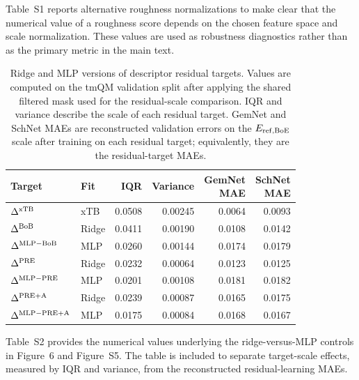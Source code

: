 \documentclass[11pt]{article}
\begin{document}
Table~S1 reports alternative roughness normalizations to make clear that the numerical value of a roughness score depends on the chosen feature space and scale normalization. These values are used as robustness diagnostics rather than as the primary metric in the main text.

\begin{table}[H]
  \centering
  \small
  \setlength{\tabcolsep}{7pt}
  \caption{Ridge and MLP versions of descriptor residual targets. Values are computed on the tmQM validation split after applying the shared filtered mask used for the residual-scale comparison. IQR and variance describe the scale of each residual target. GemNet and SchNet MAEs are reconstructed validation errors on the \(E_{\rm ref,BoE}\) scale after training on each residual target; equivalently, they are the residual-target MAEs.}
  \label{tab:linear-vs-mlp-residuals}
  \begin{tabular}{llrrrr}
    \toprule
    Target &
    Fit &
    IQR &
    Variance &
    \shortstack{GemNet\\MAE} &
    \shortstack{SchNet\\MAE} \\
    \midrule
    \(\Delta^{\rm xTB}\) & xTB & 0.0508 & 0.00245 & 0.0064 & 0.0093 \\
    \midrule
    \(\Delta^{\rm BoB}\) & Ridge & 0.0411 & 0.00190 & 0.0108 & 0.0142 \\
    \(\Delta^{\rm MLP-BoB}\) & MLP & 0.0260 & 0.00144 & 0.0174 & 0.0179 \\
    \(\Delta^{\rm PRE}\) & Ridge & 0.0232 & 0.00064 & 0.0123 & 0.0125 \\
    \(\Delta^{\rm MLP-PRE}\) & MLP & 0.0201 & 0.00108 & 0.0181 & 0.0182 \\
    \(\Delta^{\rm PRE+A}\) & Ridge & 0.0239 & 0.00087 & 0.0165 & 0.0175 \\
    \(\Delta^{\rm MLP-PRE+A}\) & MLP & 0.0175 & 0.00084 & 0.0168 & 0.0167 \\
    \bottomrule
  \end{tabular}
\end{table}

Table~S2 provides the numerical values underlying the ridge-versus-MLP controls in Figure~6 and Figure~S5. The table is included to separate target-scale effects, measured by IQR and variance, from the reconstructed residual-learning MAEs.

\clearpage
\end{document}
